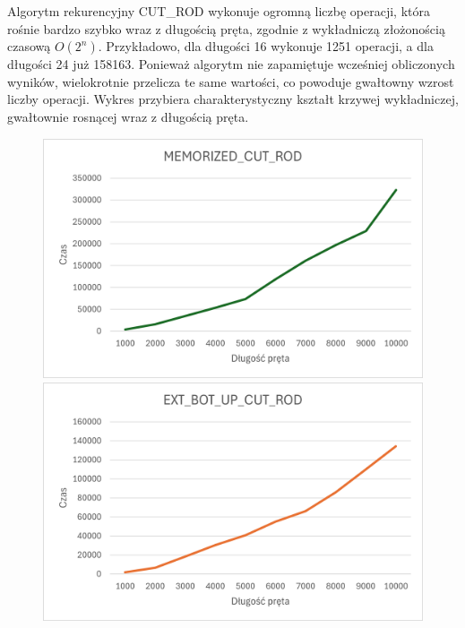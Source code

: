 \documentclass{article}
\begin{document}
Algorytm rekurencyjny CUT\_ROD wykonuje ogromną liczbę operacji, która rośnie bardzo szybko wraz z długością pręta, zgodnie z wykładniczą złożonością czasową \( O(2^n) \). Przykładowo, dla długości 16 wykonuje 1251 operacji, a dla długości 24 już 158163. Ponieważ algorytm nie zapamiętuje wcześniej obliczonych wyników, wielokrotnie przelicza te same wartości, co powoduje gwałtowny wzrost liczby operacji. Wykres przybiera charakterystyczny kształt krzywej wykładniczej, gwałtownie rosnącej wraz z długością pręta.
	
	\begin{figure}[H]
		\begin{minipage}{0.5\textwidth}
			\centering
			\includegraphics[width=\textwidth]{MemoCR.png}
		\end{minipage}%
		\begin{minipage}{0.5\textwidth}
			\centering
			\includegraphics[width=\textwidth]{ExtCR.png}
		\end{minipage}
	\end{figure}
	
\end{document}
